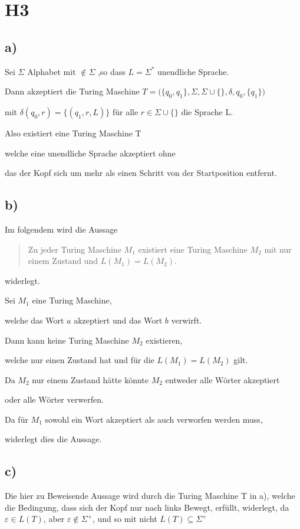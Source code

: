 \section*{H3}

\subsection*{a)}
	
Sei $\Sigma$ Alphabet mit \textvisiblespace$ \notin \Sigma$ ,so dass $L = \Sigma^{*}$ unendliche Sprache.

Dann akzeptiert die Turing Maschine 
$T = (\{q_{0},q_{1}\},\Sigma,\Sigma \cup \{$\textvisiblespace$\},\delta,q_{0},\{q_{1}\})$ 

mit $\delta(q_{0},r) = \{(q_{1},r,L)\}$ für alle $r \in \Sigma \cup \{$\textvisiblespace$\}$ die Sprache L.

Also existiert eine Turing Maschine T

welche eine unendliche Sprache akzeptiert ohne 

das der Kopf sich um mehr als einen Schritt von der Startposition entfernt.

\subsection*{b)}

Im folgendem wird die Aussage 
\begin{quote}
	Zu jeder Turing Maschine $M_{1}$ existiert eine Turing Maschine $M_{2}$
	mit nur einem Zustand und $L(M_{1}) = L(M_{2})$.
\end{quote} widerlegt.

Sei $M_{1}$ eine Turing Maschine,

welche das Wort $a$ akzeptiert und das Wort $b$ verwirft.

Dann kann keine Turing Maschine $M_{2}$ existieren,

welche nur einen Zustand hat und für die $L(M_{1})=L(M_{2})$ gilt.

Da $M_{2}$ nur einem Zustand hätte könnte $M_{2}$ entweder alle Wörter akzeptiert

oder alle Wörter verwerfen.

Da für $M_{1}$ sowohl ein Wort akzeptiert als auch verworfen werden muss,

widerlegt dies die Aussage.

\subsection*{c)}

Die hier zu Beweisende Aussage wird durch die Turing Maschine T in a),
welche die Bedingung, dass sich der Kopf nur nach links Bewegt, erfüllt, widerlegt,
da $\varepsilon \in L(T)$, aber $\varepsilon \notin \Sigma^{+}$, und so mit nicht $L(T) \subseteq \Sigma^{+}$

